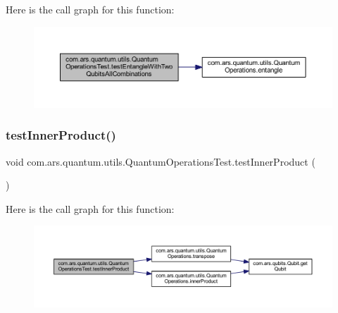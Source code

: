 Here is the call graph for this function\+:\nopagebreak
\begin{figure}[H]
\begin{center}
\leavevmode
\includegraphics[width=350pt]{classcom_1_1ars_1_1quantum_1_1utils_1_1_quantum_operations_test_afc5716dca716e29a0cdbcfe069a815a3_cgraph}
\end{center}
\end{figure}
\hypertarget{classcom_1_1ars_1_1quantum_1_1utils_1_1_quantum_operations_test_a88f7c027a6f692b9fa2e5e89f18b4a3d}{}\label{classcom_1_1ars_1_1quantum_1_1utils_1_1_quantum_operations_test_a88f7c027a6f692b9fa2e5e89f18b4a3d} 
\subsubsection{\texorpdfstring{test\+Inner\+Product()}{testInnerProduct()}}
{\footnotesize\ttfamily void com.\+ars.\+quantum.\+utils.\+Quantum\+Operations\+Test.\+test\+Inner\+Product (\begin{DoxyParamCaption}{ }\end{DoxyParamCaption})}

Here is the call graph for this function\+:\nopagebreak
\begin{figure}[H]
\begin{center}
\leavevmode
\includegraphics[width=350pt]{classcom_1_1ars_1_1quantum_1_1utils_1_1_quantum_operations_test_a88f7c027a6f692b9fa2e5e89f18b4a3d_cgraph}
\end{center}
\end{figure}
\hypertarget{classcom_1_1ars_1_1quantum_1_1utils_1_1_quantum_operations_test_a09270ff6a4f9ed716f38d2a911495e4a}{}\label{classcom_1_1ars_1_1quantum_1_1utils_1_1_quantum_operations_test_a09270ff6a4f9ed716f38d2a911495e4a} 
